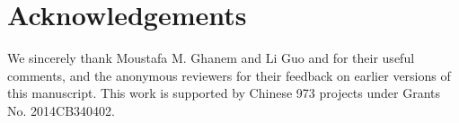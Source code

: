 \documentclass[10pt, conference, compsocconf]{IEEEtran}
\begin{document}
\section{Acknowledgements}
We sincerely thank Moustafa M. Ghanem and Li Guo and for their useful comments, and the anonymous reviewers for their feedback on earlier versions of this manuscript. This work is supported by Chinese 973 projects under Grants No. 2014CB340402.



\end{document}
